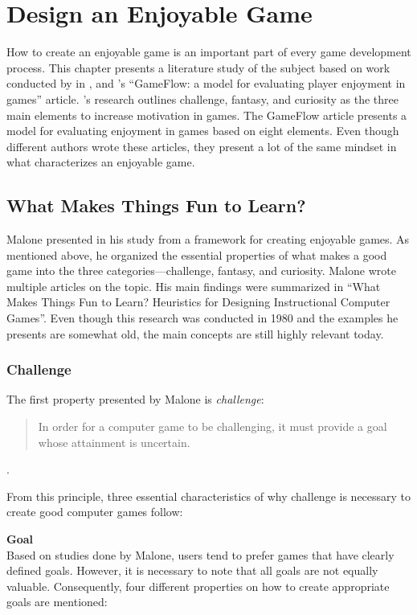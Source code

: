\section{Design an Enjoyable Game}
\label{chap:design_an_enjoyable_game}

How to create an enjoyable game is an important part of every game development process. This chapter presents a literature study of the subject based on work conducted by \citeauthor{malone_what_1980} in \citeyear{malone_what_1980}, and \citeauthor{sweetser_gameflow_2005}’s “GameFlow: a model for evaluating player enjoyment in games” article. \citeauthor{malone_what_1980}’s research outlines challenge, fantasy, and curiosity as the three main elements to increase motivation in games. The GameFlow article presents a model for evaluating enjoyment in games based on eight elements. Even though different authors wrote these articles, they present a lot of the same mindset in what characterizes an enjoyable game.

\subsection{What Makes Things Fun to Learn?}
Malone presented in his study from \citeyear{malone_what_1980} a framework for creating enjoyable games. As mentioned above, he organized the essential properties of what makes a good game into the three categories—challenge, fantasy, and curiosity. Malone wrote multiple articles on the topic. His main findings were summarized in “What Makes Things Fun to Learn? Heuristics for Designing Instructional Computer Games”. Even though this research was conducted in 1980 and the examples he presents are somewhat old, the main concepts are still highly relevant today.

\subsubsection{Challenge}
The first property presented by Malone is \textit{challenge}:

\blockquote{In order for a computer game to be challenging, it must provide a goal whose attainment is uncertain.} \citep{malone_what_1980}. 

From this principle, three essential characteristics of why challenge is necessary to create good computer games follow:

\textbf{Goal} \\
Based on studies done by Malone, users tend to prefer games that have clearly defined goals. However, it is necessary to note that all goals are not equally valuable. Consequently, four different properties on how to create appropriate goals are mentioned:

